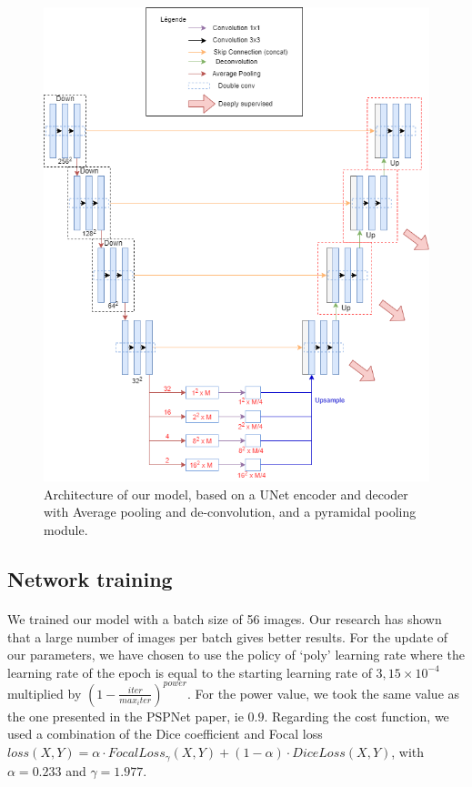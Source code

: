 \documentclass[english]{article}
\begin{document}
\begin{figure}[!t]
    \centering
    \includegraphics[scale=0.45]{img/SubUnetAvecPPM.png}
    \caption{Architecture of our model, based on a UNet encoder and decoder with Average pooling and de-convolution, and a pyramidal pooling module.}
    \label{model}
\end{figure}

\subsection{Network training}
\label{training}

\paragraph{}We trained our model with a batch size of 56 images. Our research has shown that a large number of images per batch gives better results. For the update of our parameters, we have chosen to use the policy of `poly' learning rate where the learning rate of the epoch is equal to the starting learning rate of \(3, 15\times 10^{-4}\) multiplied by $(1-\frac{iter}{max_iter})^{power}$. For the power value, we took the same value as the one presented in the PSPNet paper, ie \(0.9\). Regarding the cost function, we used a combination of the Dice coefficient and Focal loss \(loss(X,Y) = \alpha \cdot FocalLoss_{\gamma}(X,Y)+(1-\alpha) \cdot DiceLoss(X,Y)\), with \(\alpha=0.233\) and \(\gamma=1.977\).
\end{document}
